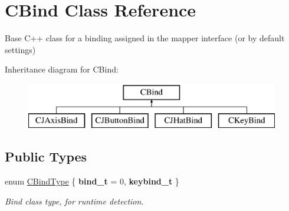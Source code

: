 \hypertarget{classCBind}{\section{C\-Bind Class Reference}
\label{classCBind}
}


Base C++ class for a binding assigned in the mapper interface (or by default settings)  


Inheritance diagram for C\-Bind\-:\begin{figure}[H]
\begin{center}
\leavevmode
\includegraphics[height=2.000000cm]{classCBind}
\end{center}
\end{figure}
\subsection*{Public Types}
\begin{DoxyCompactItemize}
\item 
enum \hyperlink{classCBind_a6bd04329a3b3b8673f7bd4469f92eb61}{C\-Bind\-Type} \{ {\bfseries bind\-\_\-t} = 0, 
{\bfseries keybind\-\_\-t}
 \}
\begin{DoxyCompactList}\small\item\em Bind class type, for runtime detection. \end{DoxyCompactList}\end{DoxyCompactItemize}

